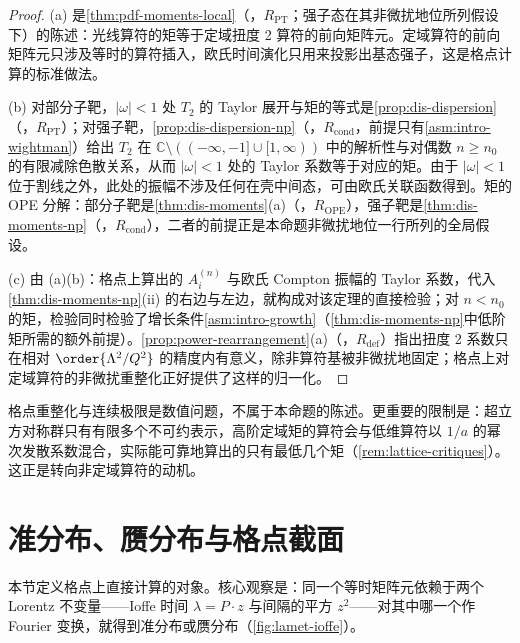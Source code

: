 \begin{proof}
(a) 是\cref{thm:pdf-moments-local}（\tagR，$R_{\mathrm{PT}}$；强子态在其非微扰地位所列假设下）的陈述：光线算符的矩等于定域扭度 2 算符的前向矩阵元。定域算符的前向矩阵元只涉及等时的算符插入，欧氏时间演化只用来投影出基态强子，这是格点计算的标准做法。

(b) 对部分子靶，$|\omega|<1$ 处 $T_2$ 的 Taylor 展开与矩的等式是\cref{prop:dis-dispersion}（\tagR，$R_{\mathrm{PT}}$）；对强子靶，\cref{prop:dis-dispersion-np}（\tagR，$R_{\mathrm{cond}}$，前提只有\cref{asm:intro-wightman}）给出 $T_2$ 在 $\mathbb C\setminus((-\infty,-1]\cup[1,\infty))$ 中的解析性与对偶数 $n\ge n_0$ 的有限减除色散关系，从而 $|\omega|<1$ 处的 Taylor 系数等于对应的矩。由于 $|\omega|<1$ 位于割线之外，此处的振幅不涉及任何在壳中间态，可由欧氏关联函数得到。矩的 OPE 分解：部分子靶是\cref{thm:dis-moments}(a)（\tagR，$R_{\mathrm{OPE}}$），强子靶是\cref{thm:dis-moments-np}（\tagR，$R_{\mathrm{cond}}$），二者的前提正是本命题非微扰地位一行所列的全局假设。

(c) 由 (a)(b)：格点上算出的 $A^{(n)}_i$ 与欧氏 Compton 振幅的 Taylor 系数，代入\cref{thm:dis-moments-np}(ii) 的右边与左边，就构成对该定理的直接检验；对 $n<n_0$ 的矩，检验同时检验了增长条件\cref{asm:intro-growth}（\cref{thm:dis-moments-np}中低阶矩所需的额外前提）。\cref{prop:power-rearrangement}(a)（\tagR，$R_{\mathrm{def}}$）指出扭度 2 系数只在相对 $\order{\Lambda^2/Q^2}$ 的精度内有意义，除非算符基被非微扰地固定；格点上对定域算符的非微扰重整化正好提供了这样的归一化。
\end{proof}

格点重整化与连续极限是数值问题，不属于本命题的陈述。更重要的限制是：超立方对称群只有有限多个不可约表示，高阶定域矩的算符会与低维算符以 $1/a$ 的幂次发散系数混合，实际能可靠地算出的只有最低几个矩（\cref{rem:lattice-critiques}）。这正是转向非定域算符的动机。

\section{准分布、赝分布与格点截面}\label{sec:lattice-quasi}

本节定义格点上直接计算的对象。核心观察是：同一个等时矩阵元依赖于两个 Lorentz 不变量——Ioffe 时间 $\lambda=P\cdot z$ 与间隔的平方 $z^2$——对其中哪一个作 Fourier 变换，就得到准分布或赝分布（\cref{fig:lamet-ioffe}）。

